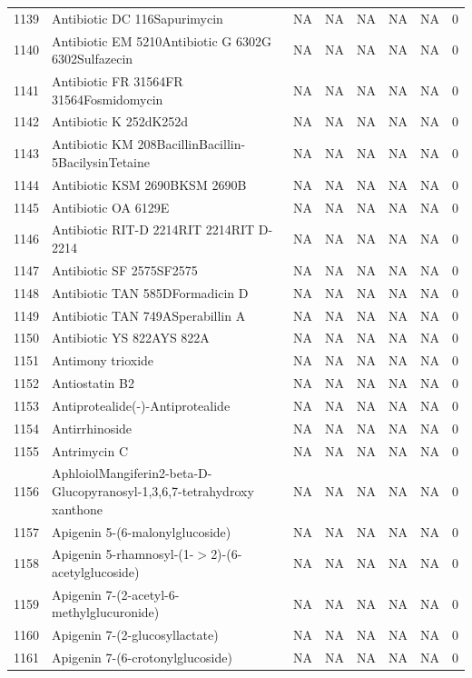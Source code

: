 \documentclass[a4paper]{article}
\begin{document}
\begin{longtable}{rlllllll}
  1139 & Antibiotic DC 116Sapurimycin & NA & NA & NA & NA & NA & 0 \\ 
  1140 & Antibiotic EM 5210Antibiotic G 6302G 6302Sulfazecin & NA & NA & NA & NA & NA & 0 \\ 
  1141 & Antibiotic FR 31564FR 31564Fosmidomycin & NA & NA & NA & NA & NA & 0 \\ 
  1142 & Antibiotic K 252dK252d & NA & NA & NA & NA & NA & 0 \\ 
  1143 & Antibiotic KM 208BacillinBacillin-5BacilysinTetaine & NA & NA & NA & NA & NA & 0 \\ 
  1144 & Antibiotic KSM 2690BKSM 2690B & NA & NA & NA & NA & NA & 0 \\ 
  1145 & Antibiotic OA 6129E & NA & NA & NA & NA & NA & 0 \\ 
  1146 & Antibiotic RIT-D 2214RIT 2214RIT D-2214 & NA & NA & NA & NA & NA & 0 \\ 
  1147 & Antibiotic SF 2575SF2575 & NA & NA & NA & NA & NA & 0 \\ 
  1148 & Antibiotic TAN 585DFormadicin D & NA & NA & NA & NA & NA & 0 \\ 
  1149 & Antibiotic TAN 749ASperabillin A & NA & NA & NA & NA & NA & 0 \\ 
  1150 & Antibiotic YS 822AYS 822A & NA & NA & NA & NA & NA & 0 \\ 
  1151 & Antimony trioxide & NA & NA & NA & NA & NA & 0 \\ 
  1152 & Antiostatin B2 & NA & NA & NA & NA & NA & 0 \\ 
  1153 & Antiprotealide(-)-Antiprotealide & NA & NA & NA & NA & NA & 0 \\ 
  1154 & Antirrhinoside & NA & NA & NA & NA & NA & 0 \\ 
  1155 & Antrimycin C & NA & NA & NA & NA & NA & 0 \\ 
  1156 & AphloiolMangiferin2-beta-D-Glucopyranosyl-1,3,6,7-tetrahydroxy xanthone & NA & NA & NA & NA & NA & 0 \\ 
  1157 & Apigenin 5-(6-malonylglucoside) & NA & NA & NA & NA & NA & 0 \\ 
  1158 & Apigenin 5-rhamnosyl-(1-$>$2)-(6-acetylglucoside) & NA & NA & NA & NA & NA & 0 \\ 
  1159 & Apigenin 7-(2-acetyl-6-methylglucuronide) & NA & NA & NA & NA & NA & 0 \\ 
  1160 & Apigenin 7-(2-glucosyllactate) & NA & NA & NA & NA & NA & 0 \\ 
  1161 & Apigenin 7-(6-crotonylglucoside) & NA & NA & NA & NA & NA & 0 \\ 

\end{longtable}
\end{document}
